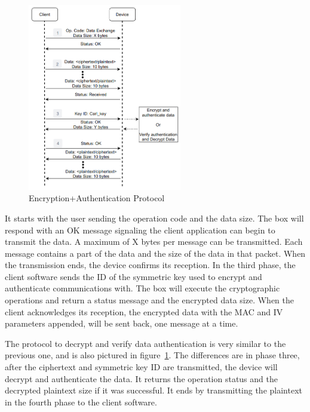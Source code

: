 \begin{figure}[h!]
	\centering
	\includegraphics[width=0.6\textwidth]{./Images/data-exchange.png}
	\caption{Encryption+Authentication Protocol}
	\label{fig:protocol:data-exchange}
\end{figure}

It starts with the user sending the operation code and the data size. The box will respond with an OK message signaling the client application can begin to transmit the data. A maximum of X bytes per message can be transmitted. Each message contains a part of the data and the size of the data in that packet. When the transmission ends, the device confirms its reception.
In the third phase, the client software sends the ID of the symmetric key used to encrypt and authenticate communications with. The box will execute the cryptographic operations and return a status message and the encrypted data size.
When the client acknowledges its reception, the encrypted data with the \ac{MAC} and \ac{IV} parameters appended, will be sent back, one message at a time.

The protocol to decrypt and verify data authentication is very similar to the previous one, and is also pictured in figure~\ref{fig:protocol:data-exchange}. The differences are in phase three, after the ciphertext and symmetric key ID are transmitted, the device will decrypt and authenticate the data. It returns the operation status and the decrypted plaintext size if it was successful. It ends by transmitting the plaintext in the fourth phase to the client software.

\hfill
\hfill


